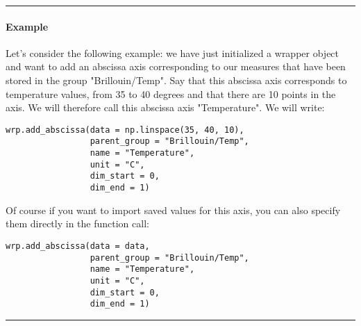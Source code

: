 \begin{center}
    \rule{15cm}{0.4pt}
\end{center}

\paragraph*{Example}
Let's consider the following example: we have just initialized a wrapper object and want to add an abscissa axis corresponding to our measures that have been stored in the group "Brillouin/Temp". Say that this abscissa axis corresponds to temperature values, from 35 to 40 degrees and that there are 10 points in the axis. We will therefore call this abscissa axis "Temperature". We will write:
\begin{lstlisting}
wrp.add_abscissa(data = np.linspace(35, 40, 10),
                 parent_group = "Brillouin/Temp", 
                 name = "Temperature",
                 unit = "C",
                 dim_start = 0,
                 dim_end = 1)
\end{lstlisting}

Of course if you want to import saved values for this axis, you can also specify them directly in the function call:
\begin{lstlisting}
wrp.add_abscissa(data = data,
                 parent_group = "Brillouin/Temp", 
                 name = "Temperature",
                 unit = "C",
                 dim_start = 0,
                 dim_end = 1)
\end{lstlisting}

\begin{center}
    \rule{15cm}{0.4pt}
\end{center}
